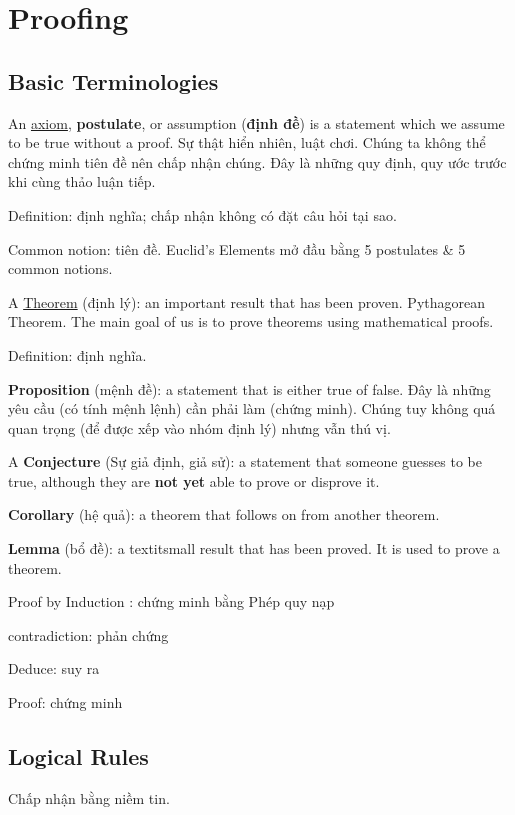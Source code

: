 \chapter{Proofing}

\section{Basic Terminologies}

An \href{https://en.wikipedia.org/wiki/Axiom}{axiom}, \textbf{postulate}, or assumption (\textbf{định đề}) is a statement which we assume to be true without a proof. Sự thật hiển nhiên, luật chơi. Chúng ta không thể chứng minh tiên đề nên chấp nhận chúng. Đây là những quy định, quy ước trước khi cùng thảo luận tiếp.

Definition: định nghĩa; chấp nhận không có đặt câu hỏi tại sao.

Common notion: tiên đề. Euclid's Elements mở đầu bằng 5 postulates \& 5 common notions.

A \href{https://en.wikipedia.org/wiki/Theorem}{Theorem} (định lý): an important result that has been proven. Pythagorean Theorem. The main goal of us is to prove theorems using mathematical proofs.

Definition: định nghĩa.

\textbf{Proposition} (mệnh đề): a statement that is either true of false. Đây là những yêu cầu (có tính mệnh lệnh) cần phải làm (chứng minh). Chúng tuy không quá quan trọng (để được xếp vào nhóm định lý) nhưng vẫn thú vị.

A \textbf{Conjecture} (Sự giả định, giả sử): a statement that someone guesses to be true, although they are \textbf{not yet} able to prove or disprove it.

\textbf{Corollary} (hệ quả): a theorem that follows on from another theorem.

\textbf{Lemma} (bổ đề): a textit{small} result that has been proved. It is used to prove a theorem.

Proof by Induction : chứng minh bằng Phép quy nạp

contradiction: phản chứng

Deduce: suy ra

Proof: chứng minh

\section{Logical Rules}

Chấp nhận bằng niềm tin.

